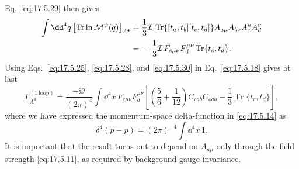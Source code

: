 Eq.~\eqref{eq:17.5.29} then gives
\begin{align}
\int \dd^4q\left[\operatorname{Tr}\ln\mathcal M^\psi(q)\right]_{A^4}
={}&\frac13\mathcal I\,\operatorname{Tr}
\{[t_a,t_b][t_c,t_d]\}
A_{a\mu}A_{b\nu}A_c^\mu A_d^\nu
\notag\\
={}&-\frac13\mathcal I\,F_{c\mu\nu}F_d^{\mu\nu}
\operatorname{Tr}\{t_c,t_d\}.
\label{eq:17.5.30}
\end{align}
Using Eqs.~\eqref{eq:17.5.25}, \eqref{eq:17.5.28}, and
\eqref{eq:17.5.30} in Eq.~\eqref{eq:17.5.18} gives at last
\begin{equation}
\Gamma_{A^4}^{(1\ \mathrm{loop})}
=\frac{-\ii\mathcal I}{(2\pi)^4}\int \dd^4x\,F_{c\mu\nu}F_d^{\mu\nu}
\left[\left(\frac56+\frac1{12}\right)
C_{cab}C_{\dd ab}
-\frac13\operatorname{Tr}\{t_c,t_d\}\right],
\label{eq:17.5.31}
\end{equation}
where we have expressed the momentum-space delta-function in
\eqref{eq:17.5.14} as
\begin{equation}
\delta^4(p-p)=(2\pi)^{-4}\int \dd^4x\,1.
\label{eq:17.5.32}
\end{equation}
It is important that the result turns out to depend on $A_{a\mu}$ only
through the field strength \eqref{eq:17.5.11}, as required by background
gauge invariance.

